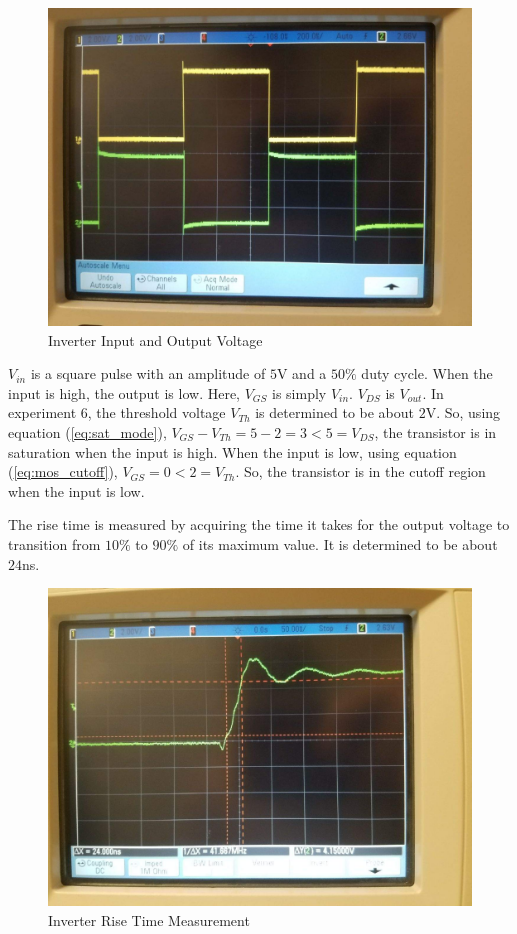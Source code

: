 \FloatBarrier
\begin{figure}[h!]
	\centering
	\includegraphics[scale=0.25]{./images/inverter_in_out.jpeg}
	\caption{Inverter Input and Output Voltage}
	\label{fig:inverter_in_out}
\end{figure}
\FloatBarrier

$V_{in}$ is a square pulse with an amplitude of $5$\si{\volt} and a $50\%$ duty cycle. When the input is high, the output is low. Here, $V_{GS}$ is simply $V_{in}$. $V_{DS}$ is $V_{out}$. In experiment 6, the threshold voltage $V_{Th}$ is determined to be about $2$\si{\volt}. So, using equation (\ref{eq:sat_mode}), $V_{GS} - V_{Th} = 5 - 2 = 3 < 5 = V_{DS}$, the transistor is in saturation when the input is high. When the input is low, using equation (\ref{eq:mos_cutoff}), $V_{GS} = 0 < 2 = V_{Th}$. So, the transistor is in the cutoff region when the input is low.

The rise time is measured by acquiring the time it takes for the output voltage to transition from $10\%$ to $90\%$ of its maximum value. It is determined to be about $24$\si{\nano\second}.

\FloatBarrier
\begin{figure}[h!]
	\centering
	\includegraphics[scale=0.25]{./images/inverter_tr.jpeg}
	\caption{Inverter Rise Time Measurement}
	\label{fig:inverter_rise_time}
\end{figure}
\FloatBarrier

